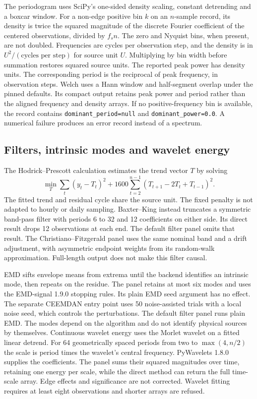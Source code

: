 The periodogram uses SciPy's one-sided density scaling, constant detrending and a boxcar window. For a non-edge positive bin $k$ on an $n$-sample record, its density is twice the squared magnitude of the discrete Fourier coefficient of the centered observations, divided by $f_s n$. The zero and Nyquist bins, when present, are not doubled. Frequencies are cycles per observation step, and the density is in $U^2/(\text{cycles per step})$ for source unit $U$. Multiplying by bin width before summation restores squared source units. The reported peak power has density units. The corresponding period is the reciprocal of peak frequency, in observation steps. Welch uses a Hann window and half-segment overlap under the pinned defaults. Its compact output retains peak power and period rather than the aligned frequency and density arrays. If no positive-frequency bin is available, the record contains \texttt{dominant\_period=null} and \texttt{dominant\_power=0.0}. A numerical failure produces an error record instead of a spectrum.

\subsection{Filters, intrinsic modes and wavelet energy}
\label{sec:diagnostic-filters}
The Hodrick--Prescott calculation estimates the trend vector $T$ by solving
\begin{equation}
 \min_T\sum_t(y_t-T_t)^2+1600\sum_{t=2}^{n-1}(T_{t+1}-2T_t+T_{t-1})^2 .
\end{equation}
The fitted trend and residual cycle share the source unit. The fixed penalty is not adapted to hourly or daily sampling. Baxter--King instead truncates a symmetric band-pass filter with periods 6 to 32 and 12 coefficients on either side. Its direct result drops 12 observations at each end. The default filter panel omits that result. The Christiano--Fitzgerald panel uses the same nominal band and a drift adjustment, with asymmetric endpoint weights from its random-walk approximation. Full-length output does not make this filter causal.

EMD sifts envelope means from extrema until the backend identifies an intrinsic mode, then repeats on the residue. The panel retains at most six modes and uses the EMD-signal 1.9.0 stopping rules. Its plain EMD seed argument has no effect. The separate CEEMDAN entry point uses 50 noise-assisted trials with a local noise seed, which controls the perturbations. The default filter panel runs plain EMD. The modes depend on the algorithm and do not identify physical sources by themselves. Continuous wavelet energy uses the Morlet wavelet on a fitted linear detrend. For 64 geometrically spaced periods from two to $\max(4,n/2)$ the scale is period times the wavelet's central frequency. PyWavelets 1.8.0 supplies the coefficients. The panel sums their squared magnitudes over time, retaining one energy per scale, while the direct method can return the full time-scale array. Edge effects and significance are not corrected. Wavelet fitting requires at least eight observations and shorter arrays are refused.


